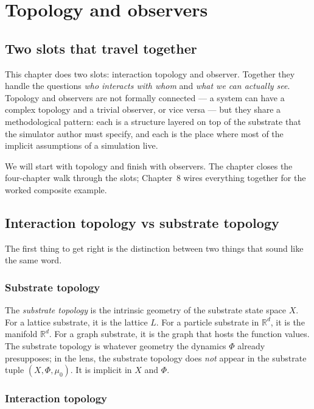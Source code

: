 \chapter{Topology and observers}

\section{Two slots that travel together}

This chapter does two slots: interaction topology and observer.
Together they handle the questions \emph{who interacts with whom}
and \emph{what we can actually see}. Topology and observers are not
formally connected --- a system can have a complex topology and a
trivial observer, or vice versa --- but they share a methodological
pattern: each is a structure layered on top of the substrate that the
simulator author must specify, and each is the place where most of the
implicit assumptions of a simulation live.

We will start with topology and finish with observers. The chapter
closes the four-chapter walk through the slots; Chapter~8 wires
everything together for the worked composite example.

\section{Interaction topology vs substrate topology}

The first thing to get right is the distinction between two things
that sound like the same word.

\subsection*{Substrate topology}

The \emph{substrate topology} is the intrinsic geometry of the
substrate state space $X$. For a lattice substrate, it is the lattice
$L$. For a particle substrate in $\mathbb{R}^d$, it is the manifold
$\mathbb{R}^d$. For a graph substrate, it is the graph that hosts the
function values. The substrate topology is whatever geometry the
dynamics $\Phi$ already presupposes; in the lens, the substrate
topology does \emph{not} appear in the substrate tuple $(X, \Phi,
\mu_0)$. It is implicit in $X$ and $\Phi$.

\subsection*{Interaction topology}

